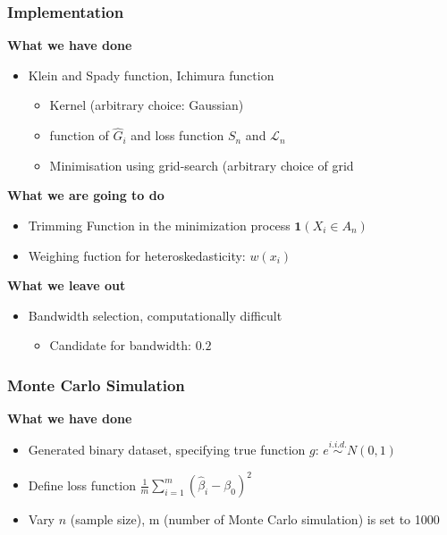 \documentclass{beamer}
\begin{document}
\begin{frame}[t]
	\frametitle{Implementation}

	\textbf{What we have done}
	\begin{itemize}
		\item Klein and Spady function, Ichimura function 
		\begin{itemize}\item Kernel (arbitrary choice: Gaussian) 
			\item function of $\hat{G}_{i}$ and loss function $S_n$ and $\mathcal{L}_n$
			\item Minimisation using grid-search  (arbitrary choice of grid
		\end{itemize}
	\end{itemize}
          \textbf{What we are going to do}
	\begin{itemize}
		\item Trimming Function in the minimization process $\mathbf{1}{(X_i \in A_n)}$
		\item Weighing fuction for heteroskedasticity: $w(x_i)$
	\end{itemize}

	\smallskip

	\textbf{What we leave out}
	\begin{itemize}
		\item Bandwidth selection, computationally difficult
		\begin{itemize}
			\item Candidate for bandwidth: $0.2$
		\end{itemize}
	\end{itemize}
	\note{~}
\end{frame}





\begin{frame}[t]
	\frametitle{Monte Carlo Simulation}

	\textbf{What we have done}
	\begin{itemize}
		\item Generated binary dataset, specifying true function $g$: $ e \overset{i.i.d.}{\sim} N(0, 1)$
		\item Define loss function $ \frac{1}{m}\sum_{i=1}^{m}(\hat{\beta}_i - \beta_0)^2 $
		\item Vary $n$ (sample size), m (number of Monte Carlo simulation) is set to 1000
     \end{itemize}
\end{frame}
\end{document}
